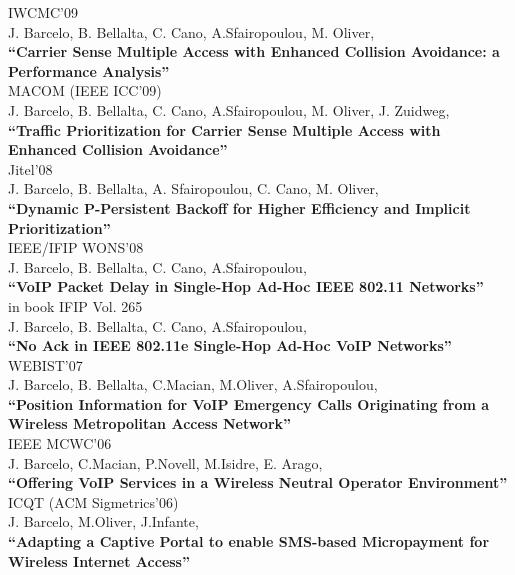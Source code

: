 \documentclass[line,margin]{res}
\begin{document}
\begin{resume}
\hfill {IWCMC'09} \\
J. Barcelo, B. Bellalta,  C. Cano, A.Sfairopoulou, M. Oliver,\\
\textbf{``Carrier Sense Multiple Access with Enhanced Collision Avoidance: a Performance Analysis''}\\

\hfill {MACOM (IEEE ICC'09)} \\
J. Barcelo, B. Bellalta,  C. Cano, A.Sfairopoulou, M. Oliver, J. Zuidweg,\\
\textbf{``Traffic Prioritization for Carrier Sense Multiple Access with Enhanced Collision Avoidance''}\\

\hfill {Jitel'08} \\
J. Barcelo, B. Bellalta, A. Sfairopoulou, C. Cano, M. Oliver,\\
\textbf{``Dynamic P-Persistent Backoff for Higher Efficiency and Implicit Prioritization''}\\

\hfill {IEEE/IFIP WONS'08} \\
J. Barcelo, B. Bellalta,  C. Cano, A.Sfairopoulou,\\
\textbf{``VoIP Packet Delay in Single-Hop Ad-Hoc IEEE 802.11 Networks''}\\

\hfill {in book IFIP Vol. 265} \\
J. Barcelo, B. Bellalta,  C. Cano, A.Sfairopoulou,\\
\textbf{``No Ack in IEEE 802.11e Single-Hop Ad-Hoc VoIP Networks''}\\

\hfill {WEBIST'07} \\
J. Barcelo, B. Bellalta, C.Macian, M.Oliver, A.Sfairopoulou,\\
\textbf{``Position Information for VoIP Emergency Calls Originating from a Wireless Metropolitan Access Network''}\\

\hfill {IEEE MCWC'06} \\
J. Barcelo, C.Macian, P.Novell, M.Isidre, E. Arago,\\
\textbf{``Offering VoIP Services in a Wireless Neutral Operator Environment''}\\

\hfill {ICQT (ACM Sigmetrics'06)} \\
J. Barcelo, M.Oliver, J.Infante,\\
\textbf{``Adapting a Captive Portal to enable SMS-based Micropayment for Wireless Internet Access''}\\


\end{resume}
\end{document}
